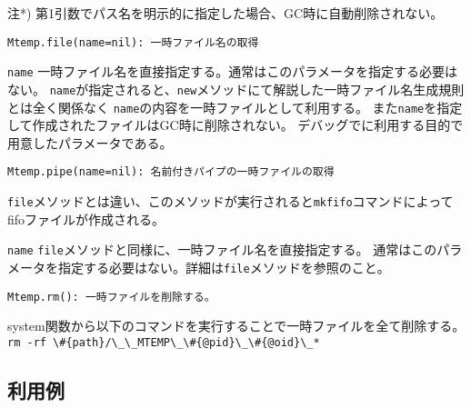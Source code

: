{\begin{description}
注*) 第1引数でパス名を明示的に指定した場合、GC時に自動削除されない。
\end{description}

{\large
\begin{verbatim}
Mtemp.file(name=nil): 一時ファイル名の取得
\end{verbatim}
}
\begin{description}
	\setlength{\itemindent}{-5mm}
	\item {\large \verb/name/} 一時ファイル名を直接指定する。通常はこのパラメータを指定する必要はない。
\verb/name/が指定されると、\verb/new/メソッドにて解説した一時ファイル名生成規則とは全く関係なく
\verb/name/の内容を一時ファイルとして利用する。
また\verb|name|を指定して作成されたファイルはGC時に削除されない。
デバッグでに利用する目的で用意したパラメータである。
\end{description}

{\large
\begin{verbatim}
Mtemp.pipe(name=nil): 名前付きパイプの一時ファイルの取得
\end{verbatim}
}
\verb|file|メソッドとは違い、このメソッドが実行されると\verb|mkfifo|コマンドによってfifoファイルが作成される。

\begin{description}
	\setlength{\itemindent}{-5mm}
	\item {\large \verb/name/} \verb|file|メソッドと同様に、一時ファイル名を直接指定する。
通常はこのパラメータを指定する必要はない。詳細は\verb|file|メソッドを参照のこと。
\end{description}

{\large
\begin{verbatim}
Mtemp.rm(): 一時ファイルを削除する。
\end{verbatim}
}

system関数から以下のコマンドを実行することで一時ファイルを全て削除する。
\verb |rm -rf \#{path}/\_\_MTEMP\_\#{@pid}\_\#{@oid}\_*|


\subsection{利用例}

}

